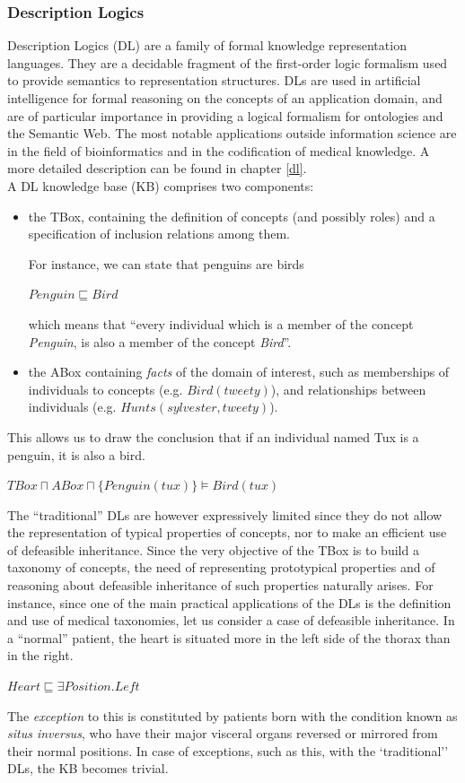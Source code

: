 \documentclass[a4paper, 11pt, oneside]{duthesis}
\begin{document}
\subsubsection{Description Logics}
Description Logics (DL) are a family of formal knowledge representation languages. They are a decidable fragment of the first-order logic formalism used to provide semantics to representation structures.
DLs are used in artificial intelligence for formal reasoning on the concepts of an application domain, and are of particular importance in providing a logical formalism for ontologies and the Semantic Web. The most notable applications outside information science are in the field of bioinformatics and in the codification of medical knowledge. A more detailed description can be found in chapter \ref{dl}.\\


A DL knowledge base (KB) comprises two components:
\begin{itemize}
	\item the TBox, containing the definition of concepts (and possibly roles) and a specification of inclusion relations among them.
	
	For instance, we can state that penguins are birds
\begin{center}$Penguin\sqsubseteq Bird$\end{center}
which means that ``every individual which is a member of the concept \emph{Penguin}, is also a member of the concept \emph{Bird}''.
	\item the ABox containing \emph{facts} of the domain of interest, such as memberships of individuals to concepts (e.g. $Bird(tweety)$), and relationships between individuals (e.g. $Hunts(sylvester, tweety)$).
\end{itemize}


This allows us to draw the conclusion that if an individual named Tux is a penguin, it is also a bird.
\begin{center}$TBox \sqcap ABox \sqcap \{Penguin(tux)\}\models Bird(tux)$\end{center}

The ``traditional'' DLs are however expressively limited since they do not allow the representation of typical properties of concepts, nor to make an efficient use of defeasible inheritance.
Since the very objective of the TBox is to build a taxonomy of concepts, the need of representing prototypical properties and of reasoning about defeasible inheritance of such properties naturally arises.
For instance, since one of the main practical applications of the DLs is the definition and use of medical taxonomies, let us consider a case of defeasible inheritance.
In a ``normal'' patient, the heart is situated more in the left side of the thorax than in the right.
\begin{center}
$Heart \sqsubseteq \exists Position.Left$
\end{center}
The \emph{exception} to this is constituted by patients born with the condition known as \emph{situs inversus}, who have their major visceral organs reversed or mirrored from their normal positions. In case of exceptions, such as this, with the `traditional'' DLs, the KB becomes trivial.\\
\end{document}

